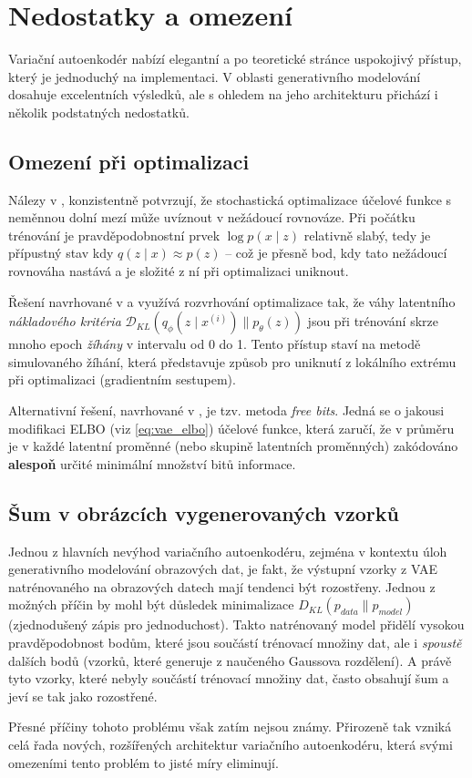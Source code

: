  \section{Nedostatky a omezení}
Variační autoenkodér nabízí elegantní a po teoretické stránce uspokojivý přístup, který je jednoduchý na implementaci.
V oblasti generativního modelování dosahuje excelentních výsledků, ale s ohledem na jeho architekturu přichází i několik podstatných nedostatků.
\subsection{Omezení při optimalizaci}
Nálezy v \cite{Bowman2016}, \cite{Soenderby2016} konzistentně potvrzují, že stochastická optimalizace účelové funkce s neměnnou dolní mezí může uvíznout v nežádoucí rovnováze.
Při počátku trénování je pravděpodobnostní prvek $\log p(x\mid z)$ relativně slabý, tedy je přípustný stav kdy $q(z \mid x) \approx p(z)$ – což je přesně bod, kdy tato nežádoucí rovnováha nastává a je složité z ní při optimalizaci uniknout.

Řešení navrhované v \cite{Bowman2016} a \cite{Soenderby2016} využívá rozvrhování optimalizace tak, že váhy latentního \emph{nákladového kritéria} $\mathcal{D}_{KL}(q_\phi(z\mid x^{(i)})\parallel p_\theta(z))$ jsou při trénování skrze mnoho epoch \emph{žíhány} v intervalu od 0 do 1.
Tento přístup staví na metodě simulovaného žíhání, která představuje způsob pro uniknutí z lokálního extrému při optimalizaci (gradientním sestupem). \cite{Kirkpatrick1983}

Alternativní řešení, navrhované v \cite{Kingma2016}, je tzv. metoda \emph{free bits}. Jedná se o jakousi modifikaci ELBO (viz \autoref{eq:vae_elbo}) účelové funkce,
která zaručí, že v průměru je v každé latentní proměnné (nebo skupině latentních proměnných) zakódováno \textbf{alespoň} určité minimální množství bitů informace.


\subsection{Šum v obrázcích vygenerovaných vzorků}
\label{sec:vae_bluriness}
Jednou z hlavních nevýhod variačního autoenkodéru, zejména v kontextu úloh generativního modelování obrazových dat, je fakt, že výstupní vzorky z VAE natrénovaného na obrazových datech mají tendenci být rozostřeny.
Jednou z možných příčin by mohl být důsledek minimalizace $D_{KL}(p_{data}\parallel p_{model})$ (zjednodušený zápis pro jednoduchost).
Takto natrénovaný model přidělí vysokou pravděpodobnost bodům, které jsou součástí trénovací množiny dat, ale i \emph{spoustě} dalších bodů (vzorků, které generuje z naučeného Gaussova rozdělení). A právě tyto vzorky, které nebyly součástí trénovací množiny dat, často obsahují šum a jeví se tak jako rozostřené. \cite{Goodfellow2016}

Přesné příčiny tohoto problému však zatím nejsou známy. Přirozeně tak vzniká celá řada nových, rozšířených architektur variačního autoenkodéru, která svými omezeními tento problém to jisté míry eliminují.